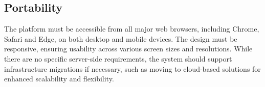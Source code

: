 \subsection{Portability}
The platform must be accessible from all major web browsers, including Chrome, Safari and Edge, on both desktop and mobile devices.
The design must be responsive, ensuring usability across various screen sizes and resolutions.
While there are no specific server-side requirements, the system should support infrastructure migrations if necessary, such as moving to cloud-based solutions for enhanced scalability and flexibility.
